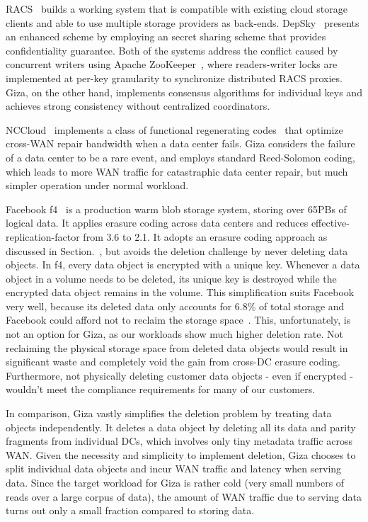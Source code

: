RACS~\cite{racs:socc10} builds a working system that is compatible with existing
cloud storage clients and able to use multiple storage providers as back-ends.
DepSky~\cite{depsky:eurosys11} presents an enhanced scheme by employing an
secret sharing scheme that provides confidentiality guarantee. Both of the
systems address the conflict caused by concurrent writers using Apache
ZooKeeper~\cite{zookeeper:atc10}, where readers-writer locks are implemented at
per-key granularity to synchronize distributed RACS proxies. Giza, on the other
hand, implements consensus algorithms for individual keys and achieves strong
consistency without centralized coordinators. 

NCCloud~\cite{nccloud:fast12} implements a class of functional regenerating
codes~\cite{dimakis07networkcoding} that optimize cross-WAN repair bandwidth
when a data center fails. Giza considers the failure of a data center to be a
rare event, and employs standard Reed-Solomon coding, which leads to more WAN
traffic for catastraphic data center repair, but much simpler operation under
normal workload.

Facebook f4~\cite{f4:osdi14} is a production warm blob storage system, storing
over 65PBs of logical data. It applies erasure coding across data centers and
reduces effective-replication-factor from 3.6 to 2.1. It adopts an erasure
coding approach as discussed in Section.~\cite{sec:alternative}, but avoids the
deletion challenge by never deleting data objects. In f4, every data object is
encrypted with a unique key. Whenever a data object in a volume needs to be
deleted, its unique key is destroyed while the encrypted data object remains in
the volume. This simplification suits Facebook very well, because its deleted
data only accounts for $6.8\%$ of total storage and Facebook could afford not to
reclaim the storage space~\cite{f4:osdi14}. This, unfortunately, is not an
option for Giza, as our workloads show much higher deletion rate. Not reclaiming
the physical storage space from deleted data objects would result in significant
waste and completely void the gain from cross-DC erasure coding. Furthermore,
not physically deleting customer data objects - even if encrypted - wouldn't
meet the compliance requirements for many of our customers.

In comparison, Giza vastly simplifies the deletion problem by treating data
objects independently. It deletes a data object by deleting all its data and
parity fragments from individual DCs, which involves only tiny metadata traffic
across WAN. Given the necessity and simplicity to implement deletion, Giza
chooses to split individual data objects and incur WAN traffic and latency when
serving data. Since the target workload for Giza is rather cold (very small
numbers of reads over a large corpus of data), the amount of WAN traffic due to
serving data turns out only a small fraction compared to storing data.


